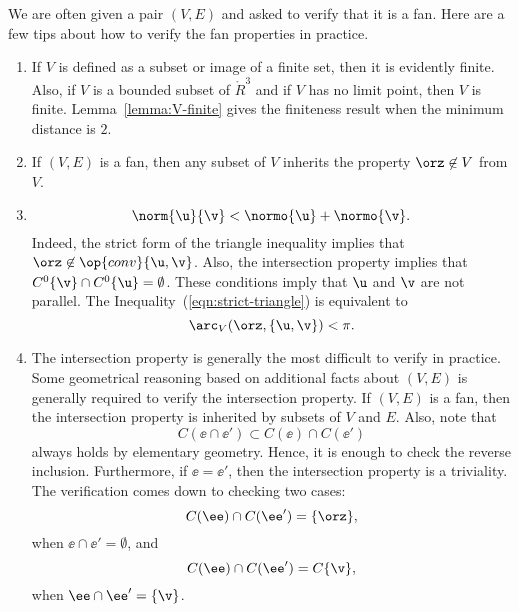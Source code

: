 \begin{remark}\label{remark:fan-verify}  
We are often given a pair $(V,E)$ and asked to verify
that it is a fan.  Here are a few tips about how to verify the fan
properties in practice.
\begin{enumerate} 
\item {} If $V$ is defined as a subset or image of a
finite set, then it is evidently finite.  Also, if $V$ is a bounded
subset of $\ring{R}^3$ and if $V$ has no limit point,  then $V$ is finite.
Lemma~\ref{lemma:V-finite} gives the finiteness result when the
minimum distance is $2$.\vspace{6pt}
\item {} If $(V,E)$ is a fan, then any subset of $V$
inherits the property $\orz\not\in V$ from $V$.  \vspace{6pt}
\item {} 
\begin{equation}\label{eqn:strict-triangle}
\norm{\u}{\v} < \normo{\u} + \normo{\v}.
\end{equation}
Indeed, the strict form of the triangle inequality implies that
$\orz\not\in \op{conv}\{\u,\v\}$.  Also, the intersection property
implies that $C^0\{\v\} \cap C^0\{\u\} = \emptyset$.  These conditions
imply that $\u$ and $\v$ are not parallel.  The Inequality~(\ref{eqn:strict-triangle})
is equivalent to
\[ 
\arc_V(\orz,\{\u,\v\}) < \pi.
\] 
\item {} The intersection property is generally the
most difficult to verify in practice.  Some geometrical reasoning
based on additional facts about $(V,E)$ is generally required to
verify the intersection property.  If $(V,E)$ is a fan, then the
intersection property is inherited by subsets of $V$ and $E$.  Also,
note that
\[ 
C(\ee\cap \ee') \subset C(\ee) \cap C(\ee')
\] 
always holds by elementary geometry.  Hence, it is enough to check the
reverse inclusion.  Furthermore, if $\ee = \ee'$, then the
intersection property is a triviality.  The verification comes down to
checking two cases:
\[ 
C(\ee) \cap C(\ee') = \{\orz\},
\] 
when $\ee\cap \ee' = \emptyset$, and
\[ 
C(\ee)\cap C(\ee') = C\{\v\},
\] 
when $\ee\cap \ee' = \{\v\}$.
\end{enumerate}
\end{remark}

